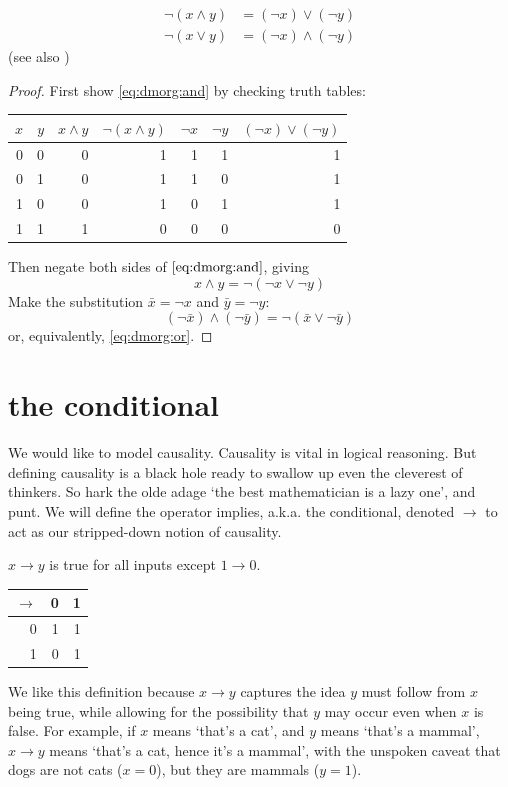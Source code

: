\documentclass{scrbook}
\renewcommand{\implies}{\to}
\begin{document}
\begin{theorem}
  \begin{align}
    \neg(x\wedge y) &=  (\neg x) \vee (\neg y) \label{eq:dmorg:and} \\
    \neg(x \vee y) &= (\neg x) \wedge (\neg y) \label{eq:dmorg:or}
  \end{align}
  (see also \cite{wiki:demorgan})
\end{theorem}
\begin{proof}
 First show \cref{eq:dmorg:and} by checking truth tables:
 \begin{center}
\begin{tabular}{rrrrrrr}
$x$ & $y$ & $x\wedge y$ & $\neg(x\wedge y)$ & $\neg x$ & $\neg y$ & $(\neg x)\vee (\neg y)$ \\
\hline
0 & 0 & 0 & 1 & 1 & 1 & 1 \\
0 & 1 & 0 & 1 & 1 & 0 & 1 \\
1 & 0 & 0 & 1 & 0 & 1 & 1 \\
1 & 1 & 1 & 0 & 0 & 0 & 0 
\end{tabular}
\end{center}
Then negate both sides of $\cref{eq:dmorg:and}$, giving 
\[
x\wedge y = \neg(\neg x \vee \neg y)
\]
Make the substitution $\bar x = \neg x$ and $\bar y =\neg y$:
\[
(\neg \bar x)\wedge (\neg \bar y) = \neg(\bar x \vee \neg \bar y)
\]
or, equivalently, \cref{eq:dmorg:or}. 
\end{proof}

\section[The Conditional]{the conditional}
We would like to model causality. Causality is vital in logical reasoning. But defining causality is a black hole ready to swallow up even the cleverest of thinkers. So hark the olde adage `the best mathematician is a lazy one', and punt. We will define the operator implies, a.k.a. the conditional, denoted $\implies$ to act as our stripped-down notion of causality. 
\begin{defn}[implies $\implies$]
  $x\implies y$ is true for all inputs except $1\implies 0$. 
\begin{center}  
\begin{tabular}{r|rr}
$\implies$ & 0 & 1 \\
\hline
0 & 1 & 1 \\
1 & 0 & 1 \\
\end{tabular}
\end{center}
\end{defn}
We like this definition because $x\implies y$ captures the idea $y$ must follow from $x$ being true, while allowing for the possibility that $y$ may occur even when $x$ is false. For example, if $x$ means `that's a cat', and $y$ means `that's a mammal', $x\implies y$ means `that's a cat, hence it's a mammal', with the unspoken caveat that dogs are not cats ($x=0$), but they are mammals ($y=1$). 
\end{document}
